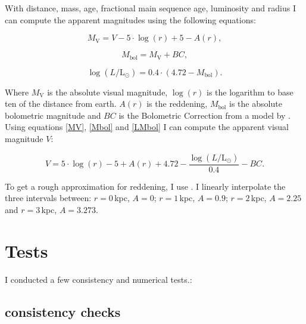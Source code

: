 \documentclass[a4paper,10pt]{article}
\begin{document}
 With distance, mass, age, fractional main sequence age, luminosity and radius I can  
 compute the apparent magnitudes using the following equations:
 
 \begin{equation}
  M_{\mathrm{V}}=V-5\cdot\log(r)+5-A(r),
  \label{MV}
 \end{equation}
 
 \begin{equation}
  M_{\mathrm{bol}}=M_{\mathrm{V}}+BC,
  \label{Mbol}
 \end{equation}
 
 \begin{equation}
  \log(L/\mathrm{L}_\odot)=0.4\cdot(4.72-M_{\mathrm{bol}}).
  \label{LMbol}
 \end{equation}
 
 Where $M_{\mathrm{V}}$ is the absolute visual magnitude, $\log(r)$ is the logarithm to base ten of the distance from earth. $A(r)$ is the 
 reddening, $M_{\mathrm{bol}}$ is the absolute bolometric magnitude and $BC$ is the Bolometric Correction from a model by 
 \citet*{1996ApJ...469..355F}. Using equations \ref{MV}, \ref{Mbol} and \ref{LMbol} I can compute the apparent visual magnitude $V$:
 
 \begin{equation}
  V=5\cdot\log(r)-5+A(r)+4.72-\frac{\log(L/\mathrm{L}_\odot)}{0.4}-BC.
 \end{equation}
 
 To get a rough approximation for reddening, I use \citet*[Figure 9]{2005AJ....130..659A}. I linearly interpolate the three intervals between:
 $r=0\,$kpc, $A=0$; $r=1\,$kpc, $A=0.9$; $r=2\,$kpc, $A=2.25$ and $r=3\,$kpc, $A=3.273$. 
 
 
 \newpage
 \section{Tests}
 I conducted a few consistency and numerical tests.:
 
 \subsection{consistency checks}
 
\end{document}
